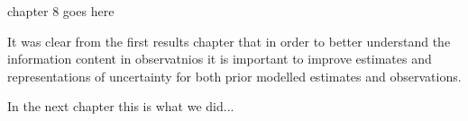 
chapter 8 goes here


It was clear from the first results chapter that in order to better understand the information content in observatnios it is important to improve estimates and representations of uncertainty for both prior modelled estimates and observations.

In the next chapter this is what we did...